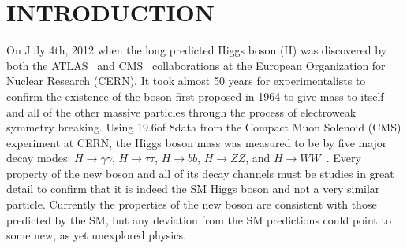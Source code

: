 %
%
%



\pagestyle{plain} %
\setcounter{page}{1}


\chapter{\uppercase {Introduction}}

On July 4th, 2012 when the long predicted Higgs boson (H) was discovered by both the ATLAS~\cite{20121} and CMS~\cite{201230} collaborations at the European Organization for Nuclear Research (CERN).
It took almost 50 years for experimentalists to confirm the existence of the boson first proposed in 1964 to give mass to itself and all of the other massive particles through the process of electroweak symmetry breaking.
Using 19.6\fbinv of 8\tev data from the Compact Muon Solenoid (CMS) experiment at CERN, the Higgs boson mass was measured to be  by five major decay modes: $H\rightarrow\gamma\gamma$, $H\rightarrow\tau\tau$, $H\rightarrow{bb}$, $H\rightarrow{ZZ}$, and $H\rightarrow{WW}$~\cite{CMS-PAS-HIG-13-005}.
Every property of the new boson and all of its decay channels must be studies in great detail to confirm that it is indeed the SM Higgs boson and not a very similar particle.
Currently the properties of the new boson are consistent with those predicted by the SM, but any deviation from the SM predictions could point to some new, as yet unexplored physics.

